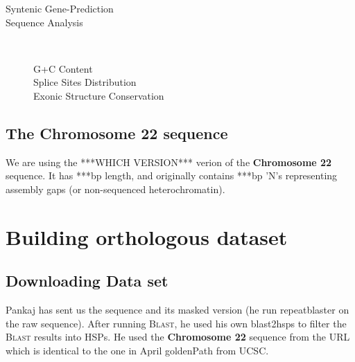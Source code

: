 \documentclass[11pt]{article}
\newcommand{\sctn}[1]{\section{#1}}
\newcommand{\subsctn}[1]{\subsection{#1}}
\def\bl{\textsc{Blast}}
\def\chr{\textbf{Chromosome 22}}
\begin{document}
\begin{description}
\begin{comment}
  ABSTRACT: We describe a novel analytical approach to gene
  recognition based on cross-species comparison. We first undertook a
  comparison of orthologous genomic loci from human and mouse, studying
  the extent of similarity in the number, size and sequence of exons and
  introns. We then developed an approach for recognizing genes within
  such orthologous regions by first aligning the regions using an
  iterative global alignment system and then identifying genes based on
  conservation of exonic features at aligned positions in both
  species. The alignment and gene recognition are performed by new
  programs called GLASS and ROSETTA, respectively. ROSETTA performed
  well at exact identification of coding exons in 117 orthologous pairs
  tested.

  Abstract URL: \url|http://www.genome.org/cgi/content/abstract/10/7/950|

\end{comment} %

 \item[Syntenic Gene-Prediction]
 \item[Sequence Analysis] \ \\
   \begin{description}
    \item[G+C Content]
    \item[Splice Sites Distribution]
    \item[Exonic Structure Conservation]
   \end{description}
\end{description}

\subsctn{The {\chr} sequence}

We are using the ***WHICH VERSION*** verion of the {\chr} sequence. It has ***bp length, and originally contains ***bp 'N's representing assembly gaps (or non-sequenced heterochromatin).

\newpage %

\sctn{Building orthologous dataset}

\subsctn{Downloading Data set}

Pankaj has sent us the sequence and its masked version (he run repeatblaster on the raw sequence). After running {\bl}, he used his own blast2hsps to filter the {\bl} results into HSPs. He used the {\chr} sequence from the URL which is identical to the one in April goldenPath from UCSC.
\end{document}
